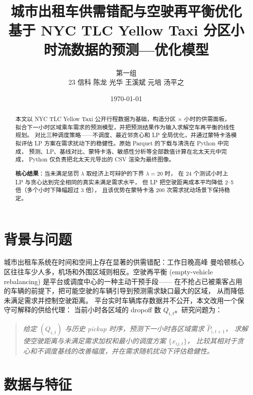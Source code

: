 \documentclass[12pt,a4paper]{article}
\title{城市出租车供需错配与空驶再平衡优化\\
       \large 基于 NYC TLC Yellow Taxi 分区小时流数据的预测—优化模型}
\author{第一组\\
        \small 23 信科 陈龙 \quad 22 光华 王溪斌 \quad 23 元培 汤平之}
\date{\today}
\begin{document}
\maketitle

\vspace{-1em}
\begin{abstract}\small
本文以 NYC TLC Yellow Taxi 公开行程数据为基础，构造分区 × 小时的供需面板，
拟合下一小时区域乘车需求的预测模型，并把预测结果作为输入求解空车再平衡的线性规划。
对比三种调度策略——不调度、最近邻贪心和 LP 全局优化，并通过蒙特卡洛模拟评估
LP 方案在需求扰动下的稳健性。原始 Parquet 的下载与清洗在 Python 中完成，
预测、LP、基线对比、蒙特卡洛、敏感性分析等全部数值计算在北太天元中完成，
Python 仅负责把北太天元导出的 CSV 渲染为最终图像。

\textbf{核心结果}：当未满足惩罚 $\lambda$ 取经济上可辩护的下界 $\lambda = 20$ 时，
在 24 个测试小时上 LP 与贪心达到完全相同的真实未满足需求水平，
但 LP 把空驶距离成本平均降低 2--5 倍（多个小时下降幅超过 3 倍），
且该优势在蒙特卡洛 200 次需求扰动场景下保持稳定。
\end{abstract}

\section{背景与问题}\label{sec:bg}
\vspace{-0.4em}

城市出租车系统在时间和空间上存在显著的供需错配：工作日晚高峰
曼哈顿核心区往往车少人多，机场和外围区域则相反。空驶再平衡
(empty-vehicle rebalancing) 是平台或调度中心的一种主动干预手段——
在不抢占已被乘客占用的车辆的前提下，把可能空驶的车辆引导到预测需求缺口最大的区域，
从而降低未满足需求并控制空驶距离。
平台实时车辆库存数据并不公开，本文改用一个保守可解释的供给代理：
当前小时各区域的 dropoff 数 $Q_{i,t}$。研究问题为：

\begin{quote}\itshape\small
给定 $(Q_{i,t})$ 与历史 pickup 时序，预测下一小时各区域需求 $\widehat P_{i,t+1}$，
求解使空驶距离与未满足需求加权和最小的调度方案 $\{x_{ij,t}\}$，
比较其相对于贪心和不调度基线的改善幅度，并在需求随机扰动下评估稳健性。
\end{quote}

\section{数据与特征}\label{sec:data}
\vspace{-0.4em}
\end{document}
